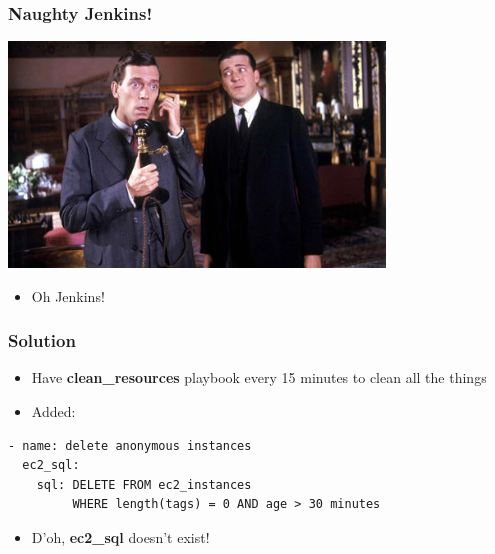 \documentclass{beamer}
\begin{document}
\begin{frame}\frametitle{Naughty Jenkins!}

    \begin{center}
        \includegraphics[width=10cm]{jeeves}
    \end{center}

    \begin{itemize}
        \item Oh Jenkins!
    \end{itemize}

\end{frame}


\begin{frame}[fragile]\frametitle{Solution}

    \begin{itemize}
        \item Have \textbf{clean\_resources} playbook every 15 minutes to clean all the things
        \item Added:
    \end{itemize}

    \begin{lstlisting}
- name: delete anonymous instances
  ec2_sql:
    sql: DELETE FROM ec2_instances
         WHERE length(tags) = 0 AND age > 30 minutes
    \end{lstlisting}

    \begin{itemize}
        \item D'oh, \textbf{ec2\_sql} doesn't exist!
    \end{itemize}

\end{frame}
\end{document}
